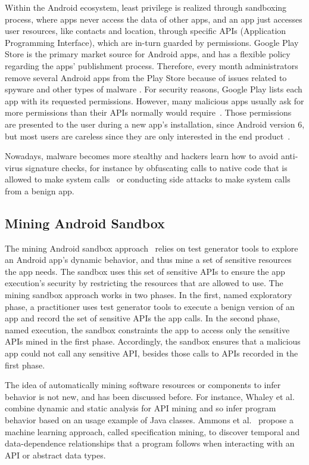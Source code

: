 Within the Android ecosystem, least privilege is realized through sandboxing process, where apps never access the data of other apps, and an app just accesses user resources, like contacts and location, through specific APIs (Application Programming Interface), which are in-turn guarded by permissions. Google Play Store is the primary market source for Android apps, and has a flexible policy regarding the apps' publishment process. Therefore, every month administrators remove several Android apps from the Play Store because of issues related to spyware and other types of malware \cite{DBLP:conf/msr/WangLL0X18}. For security reasons, Google Play lists each app with its requested permissions. However, many malicious apps usually ask for more permissions than their APIs normally would require~\cite{DBLP:conf/ccs/FeltCHSW11}. Those permissions are presented to the user during a new app's installation, since Android version 6, but most users are careless since they are only interested in the end product~\cite{DBLP:conf/soups/FeltHEHCW12}. 

Nowadays, malware becomes more stealthy and hackers learn how to avoid anti-virus signature checks, for instance by obfuscating calls to native code that is allowed to make system calls~\cite{DBLP:journals/corr/abs-2002-04540} or conducting side attacks to make system calls from a benign app.

\subsection{Mining Android Sandbox}\label{sec:android-sandbox}

The mining Android sandbox approach~\cite{DBLP:conf/icse/JamrozikSZ16} relies on test generator tools to explore an Android app's dynamic behavior, and thus mine a set of sensitive resources the app needs. The sandbox uses this set of sensitive APIs to ensure the app execution's security by restricting the resources that are allowed to use. The mining sandbox approach works in two phases. In the first, named exploratory phase, a practitioner uses test generator tools to execute a benign version of an app and record the set of sensitive APIs the app calls. In the second phase, named execution, the sandbox constraints the app to access only the sensitive APIs mined in the first phase. Accordingly, the sandbox ensures that a malicious app could not call any sensitive API, besides those calls to APIs recorded in the first phase.

The idea of automatically mining software resources or components to infer behavior is not new, and has been discussed before. For instance, Whaley et al.~\cite{DBLP:conf/issta/WhaleyML02} combine dynamic and static analysis for API mining and so infer program behavior based on an usage example of Java classes. Ammons et al.~\cite{DBLP:conf/popl/AmmonsBL02} propose a machine learning approach, called specification mining, to discover temporal and data-dependence relationships that a program follows when interacting with an API or abstract data types.

